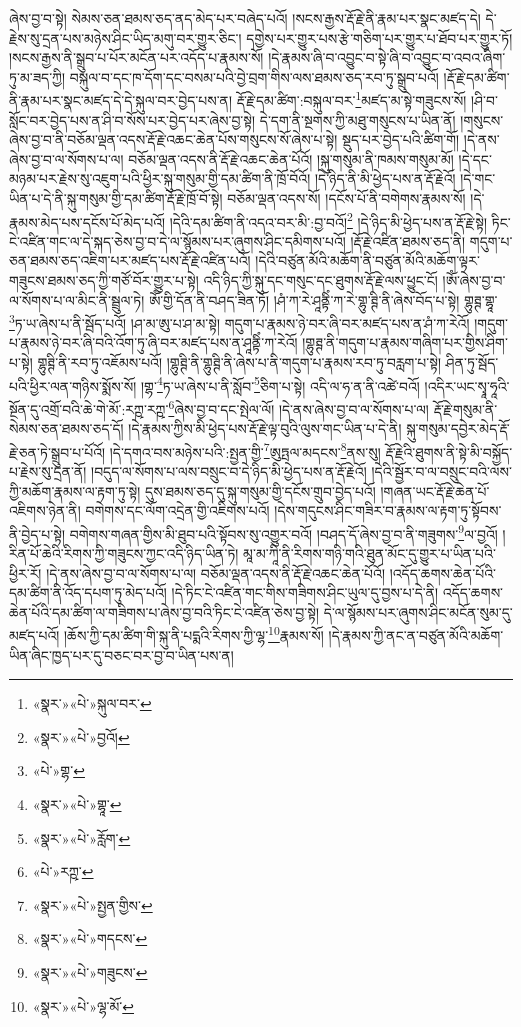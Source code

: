 ཞེས་བྱ་བ་སྟེ། སེམས་ཅན་ཐམས་ཅད་ནད་མེད་པར་བཞེད་པའོ། །སངས་རྒྱས་རྡོ་རྗེ་ནི་རྣམ་པར་སྣང་མཛད་དེ། དེ་རྗེས་སུ་དྲན་པས་མཉེས་ཤིང་ཡིད་མགུ་བར་གྱུར་ཅིང་། དགྱེས་པར་གྱུར་པས་རྩེ་གཅིག་པར་གྱུར་པ་ཐོབ་པར་གྱུར་ཏོ། །སངས་རྒྱས་ནི་སྒྲུབ་པ་པོར་མངོན་པར་འདོད་པ་རྣམས་སོ། །དེ་རྣམས་ཞི་བ་འབྱུང་བ་སྟེ་ཞི་བ་འབྱུང་བ་འབའ་ཞིག་ཏུ་མ་ཟད་ཀྱི། བསྐུལ་བ་དང་ཁ་དོག་དང་བསམ་པའི་བྱེ་བྲག་གིས་ལས་ཐམས་ཅད་རབ་ཏུ་སྒྲུབ་པའོ། །རྡོ་རྗེ་དམ་ཚིག་ནི་རྣམ་པར་སྣང་མཛད་དེ་དེ་སྐུལ་བར་བྱེད་པས་ན། རྡོ་རྗེ་དམ་ཚིག་:བསྐུལ་བར་\footnote{«སྣར་»«པེ་»སྐུལ་བར་}མཛད་མ་སྟེ་གཟུངས་སོ། །ཤི་བ་སློང་བར་བྱེད་པས་ན་ཤི་བ་སོས་པར་བྱེད་པར་ཞེས་བྱ་སྟེ། དེ་དག་ནི་སྔགས་ཀྱི་མཐུ་གསུངས་པ་ཡིན་ནོ། །གསུངས་ཞེས་བྱ་བ་ནི་བཅོམ་ལྡན་འདས་རྡོ་རྗེ་འཆང་ཆེན་པོས་གསུངས་སོ་ཞེས་པ་སྟེ། སྡུད་པར་བྱེད་པའི་ཚིག་གོ། །དེ་ནས་ཞེས་བྱ་བ་ལ་སོགས་པ་ལ། བཅོམ་ལྡན་འདས་ནི་རྡོ་རྗེ་འཆང་ཆེན་པོའོ། །སྐུ་གསུམ་ནི་ཁམས་གསུམ་མོ། །དེ་དང་མཉམ་པར་རྗེས་སུ་འཇུག་པའི་ཕྱིར་སྐུ་གསུམ་གྱི་དམ་ཚིག་ནི་ཁྲོ་བོའོ། །དེ་ཉིད་ནི་མི་ཕྱེད་པས་ན་རྡོ་རྗེའོ། །དེ་གང་ཡིན་པ་དེ་ནི་སྐུ་གསུམ་གྱི་དམ་ཚིག་རྡོ་རྗེ་ཁྲོ་བོ་སྟེ། བཅོམ་ལྡན་འདས་སོ། །དངོས་པོ་ནི་བགེགས་རྣམས་སོ། །དེ་རྣམས་མེད་པས་དངོས་པོ་མེད་པའོ། །དེའི་དམ་ཚིག་ནི་འདའ་བར་མི་:བྱ་བའོ།\footnote{«སྣར་»«པེ་»བྱའོ།} །དེ་ཉིད་མི་ཕྱེད་པས་ན་རྡོ་རྗེ་སྟེ། ཏིང་ངེ་འཛིན་གང་ལ་དེ་སྐད་ཅེས་བྱ་བ་དེ་ལ་སྙོམས་པར་ཞུགས་ཤིང་དམིགས་པའོ། །རྡོ་རྗེ་འཛིན་ཐམས་ཅད་ནི། གདུག་པ་ཅན་ཐམས་ཅད་འཇིག་པར་མཛད་པས་རྡོ་རྗེ་འཛིན་པའོ། །དེའི་བཙུན་མོའི་མཆོག་ནི་བཙུན་མོའི་མཆོག་ལྟར་གཟུངས་ཐམས་ཅད་ཀྱི་གཙོ་བོར་གྱུར་པ་སྟེ། འདི་ཉིད་ཀྱི་སྐུ་དང་གསུང་དང་ཐུགས་རྡོ་རྗེ་ལས་ཕྱུང་ངོ། །ཨོཾ་ཞེས་བྱ་བ་ལ་སོགས་པ་ལ་མིང་ནི་སྦྲུལ་ཏེ། ཨོཾ་གྱི་དོན་ནི་བཤད་ཟིན་ཏོ། །ཤཾ་ཀ་རེ་ཤཱནྟིཾ་ཀ་རེ་གྷུ་ཊྚི་ནི་ཞེས་བོད་པ་སྟེ། གྷུཊྚ་གྷཱ་\footnote{«པེ་»གྷ་}ཏ་ཡ་ཞེས་པ་ནི་སྦོད་པའོ། །ཤ་མ་ཨུ་པ་ཤ་མ་སྟེ། གདུག་པ་རྣམས་ཉེ་བར་ཞི་བར་མཛད་པས་ན་ཤཾ་ཀ་རེའོ། །གདུག་པ་རྣམས་ཉེ་བར་ཞི་བའི་འོག་ཏུ་ཞི་བར་མཛད་པས་ན་ཤཱནྟིཾ་ཀ་རེའོ། །གྷུཊྚ་ནི་གདུག་པ་རྣམས་གཞིག་པར་གྱིས་ཤིག་པ་སྟེ། གྷུཊྚི་ནི་རབ་ཏུ་འཇོམས་པའོ། །གྷུཊྚི་ནི་གྷུཊྚི་ནི་ཞེས་པ་ནི་གདུག་པ་རྣམས་རབ་ཏུ་བརླག་པ་སྟེ། ཤིན་ཏུ་སྦོད་པའི་ཕྱིར་ལན་གཉིས་སྨོས་སོ། །གྷ་\footnote{«སྣར་»«པེ་»གྷཱ་}ཏ་ཡ་ཞེས་པ་ནི་སློབ་\footnote{«སྣར་»«པེ་»རློག་}ཅིག་པ་སྟེ། འདི་ལ་ཧ་ན་ནི་འཚེ་བའོ། །འདིར་ཡང་སྭཱ་ཧཱའི་སྔོན་དུ་འགྲོ་བའི་ཆེ་གེ་མོ་:རཀྵ་རཀྵ་\footnote{«པེ་»རཀྵ་}ཞེས་བྱ་བ་དང་སྤེལ་ལོ། །དེ་ནས་ཞེས་བྱ་བ་ལ་སོགས་པ་ལ། རྡོ་རྗེ་གསུམ་ནི་སེམས་ཅན་ཐམས་ཅད་དོ། །དེ་རྣམས་ཀྱིས་མི་ཕྱེད་པས་རྡོ་རྗེ་ལྟ་བུའི་ལུས་གང་ཡིན་པ་དེ་ནི། སྐུ་གསུམ་དབྱེར་མེད་རྡོ་རྗེ་ཅན་ཏེ་སྒྲུབ་པ་པོའོ། །དེ་དགའ་བས་མཉེས་པའི་:སྤྱན་གྱི་\footnote{«སྣར་»«པེ་»སྤྱན་གྱིས་}ཨུཏྤལ་མདངས་\footnote{«སྣར་»«པེ་»གདངས་}ནས་སུ། རྡོ་རྗེའི་ཐུགས་ནི་སྟེ་མི་བསྐྱོད་པ་རྗེས་སུ་དྲན་ནོ། །བདུད་ལ་སོགས་པ་ལས་བསྲུང་བ་དེ་ཉིད་མི་ཕྱེད་པས་ན་རྡོ་རྗེའོ། །དེའི་སྦྱོར་བ་ལ་བསྲུང་བའི་ལས་ཀྱི་མཆོག་རྣམས་ལ་རྟག་ཏུ་སྟེ། དུས་ཐམས་ཅད་དུ་སྐུ་གསུམ་གྱི་དངོས་གྲུབ་བྱེད་པའོ། །གཞན་ཡང་རྡོ་རྗེ་ཆེན་པོ་འཇིགས་ཉེན་ནི། བགེགས་དང་ལོག་འདྲེན་གྱི་འཇིགས་པའོ། །དེས་གདུངས་ཤིང་གཟིར་བ་རྣམས་ལ་རྟག་ཏུ་སྟོབས་ནི་བྱེད་པ་སྟེ། བགེགས་གཞན་གྱིས་མི་ཐུབ་པའི་སྟོབས་སུ་འགྱུར་བའོ། །བཤད་དོ་ཞེས་བྱ་བ་ནི་གཟུགས་\footnote{«སྣར་»«པེ་»གཟུངས་}ལ་བྱའོ། །རིན་པོ་ཆེའི་རིགས་ཀྱི་གཟུངས་ཀྱང་འདི་ཉིད་ཡིན་ཏེ། མཱ་མ་ཀཱི་ནི་རིགས་གཉི་གའི་ཐུན་མོང་དུ་གྱུར་པ་ཡིན་པའི་ཕྱིར་རོ། །དེ་ནས་ཞེས་བྱ་བ་ལ་སོགས་པ་ལ། བཅོམ་ལྡན་འདས་ནི་རྡོ་རྗེ་འཆང་ཆེན་པོའོ། །འདོད་ཆགས་ཆེན་པོའི་དམ་ཚིག་ནི་འོད་དཔག་ཏུ་མེད་པའོ། །དེ་ཏིང་ངེ་འཛིན་གང་གིས་གཟིགས་ཤིང་ཡུལ་དུ་བྱས་པ་དེ་ནི། འདོད་ཆགས་ཆེན་པོའི་དམ་ཚིག་ལ་གཟིགས་པ་ཞེས་བྱ་བའི་ཏིང་ངེ་འཛིན་ཅེས་བྱ་སྟེ། དེ་ལ་སྙོམས་པར་ཞུགས་ཤིང་མངོན་སུམ་དུ་མཛད་པའོ། །ཆོས་ཀྱི་དམ་ཚིག་གི་སྐུ་ནི་པདྨའི་རིགས་ཀྱི་ལྷ་\footnote{«སྣར་»«པེ་»ལྷ་མོ་}རྣམས་སོ། །དེ་རྣམས་ཀྱི་ནང་ན་བཙུན་མོའི་མཆོག་ཡིན་ཞིང་ཁྱད་པར་དུ་བཅང་བར་བྱ་བ་ཡིན་པས་ན། 